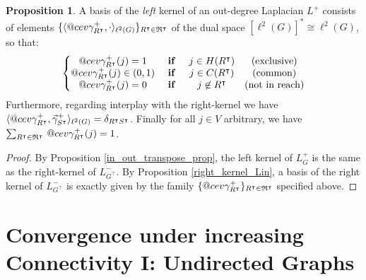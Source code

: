 \documentclass[reqno,12pt,letterpaper]{amsart}
\makeatletter
\numberwithin{equation}{section}
\newcommand{\logif}{\text{ \textbf{if} }}
\newcommand{\Lin}{L^{-}}
\newcommand{\Lout}{L^{+}}
\DeclareRobustCommand{\cev}[1]{%
	\mathpalette\do@cev{#1}%
}
\newcommand{\do@cev}[2]{%
	\fix@cev{#1}{+}%
	\reflectbox{$\m@th#1\vec{\reflectbox{$\fix@cev{#1}{-}\m@th#1#2\fix@cev{#1}{+}$}}$}%
	\fix@cev{#1}{-}%
}
\newcommand{\fix@cev}[2]{%
	\ifx#1\displaystyle
	\mkern#23mu
	\else
	\ifx#1\textstyle
	\mkern#23mu
	\else
	\ifx#1\scriptstyle
	\mkern#22mu
	\else
	\mkern#22mu
	\fi
	\fi
	\fi
}
\newcommand{\1}{\mathds{1}}
\theoremstyle{definition}
\newtheorem{Prop}[Th]{Proposition}
\makeatother
\begin{document}
\begin{Prop}\label{prop:leftkernel_+}
	A basis of the \emph{left} kernel of an out-degree Laplacian $\Lout$ consists of elements $\{\langle \cev{\gamma}^{+}_{R^\intercal},\cdot \rangle_{\ell^2(G)}  \}_{R^\intercal \in \mathfrak{R}^\intercal}$ of the dual space $[\ell^2(G)]^* \cong \ell^2(G)$, so that:
	\begin{align}
		\left\{\begin{matrix}
			\cev\gamma^{+}_{R^\intercal}(j) =1 & \logif & j\in H(R^\intercal) &\textrm{(exclusive)}\\
			\cev\gamma^{+}_{R^\intercal}(j) \in (0,1) & \logif & j\in C(R^\intercal) &\textrm{(common)}\\
			\cev\gamma^{+}_{R^\intercal}(j) =0 & \logif & j\not\in R^\intercal &\textrm{(not in reach)}\\			
		\end{matrix} \right.
	\end{align}
		Furthermore, regarding  interplay with
	the
	right-kernel we have  $
	\langle \cev\gamma^{+}_{R^\intercal}, \vec\gamma^{+}_{S^\intercal}\rangle_{\ell^2(G)} = \delta_{R^\intercal S^\intercal}$. Finally for all $j \in V$ arbitrary, we have $\sum_{R^\intercal \in \mathfrak{R}^\intercal}\,	\cev\gamma^{+}_{R^\intercal}(j) = 1$.
\end{Prop}
\begin{proof}
By Proposition \ref{in_out_transpose_prop}, the left kernel of $\Lout_G$ is the same as the right-kernel of $\Lin_{G^\intercal}$. By Proposition \ref{right_kernel_Lin}, a basis of the right kernel of $\Lin_{G^\intercal}$ is exactly given by the family $\{\cev\gamma^{+}_{R^\intercal}\}_{R^\intercal \in \mathfrak{R}^\intercal}$ specified above.
\end{proof}
	
	
	
	\section{Convergence under increasing Connectivity I: Undirected Graphs}\label{undirected_convergence}
	
\end{document}
